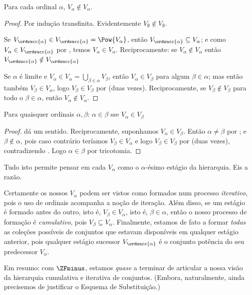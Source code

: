 \documentclass[../../../include/open-logic-section]{subfiles}
\begin{document}
\begin{lem}
Para cada ordinal $\alpha$, $V_\alpha \notin V_\alpha$.
\end{lem}

\begin{proof}
Por indução transfinita. Evidentemente $V_\emptyset \notin V_\emptyset$. 

Se $V_{\ordsucc{\alpha}} \in V_{\ordsucc{\alpha}} = \Pow{V_\alpha}$,
então $V_{\ordsucc{\alpha}} \subseteq V_\alpha$; e como $V_\alpha
\in V_{\ordsucc{\alpha}}$ por , temos
$V_\alpha \in V_\alpha$. Reciprocamente: se $V_\alpha \notin V_\alpha$
então $V_{\ordsucc{\alpha}} \notin V_{\ordsucc{\alpha}}$

Se $\alpha$ é limite e $V_\alpha \in V_\alpha = \bigcup_{\beta \in
\alpha}V_\beta$, então $V_\alpha \in V_\beta$ para algum $\beta \in
\alpha$; mas então também $V_\beta \in V_\alpha$, logo $V_\beta \in
V_\beta$ por  (duas vezes). Reciprocamente, se $V_\beta
\notin V_\beta$ para todo o $\beta \in \alpha$, então $V_\alpha \notin
V_\alpha$.
\end{proof}

\begin{cor}
Para quaisquer ordinais $\alpha, \beta$: $\alpha \in \beta$ sse $V_\alpha \in V_\beta$
\end{cor}

\begin{proof}
 dá um sentido. Reciprocamente, suponhamos $V_\alpha \in V_\beta$. Então $\alpha \neq \beta$ por ; e $\beta \notin \alpha$, pois caso contrário teríamos $V_\beta \in V_\alpha$ e logo $V_\beta \in V_\beta$ por  (duas vezes), contradizendo . Logo $\alpha \in \beta$ por tricotomia.
\end{proof}
\noindent
Tudo isto permite pensar em cada $V_\alpha$ como o $\alpha$-ésimo
estágio da hierarquia. Eis a razão.

Certamente os nossos $V_\alpha$ podem ser vistos como formados num
processo \emph{iterativo}, pois o uso de ordinais acompanha a noção de
iteração. Além disso, se um estágio é formado antes do outro, isto é,
$V_\beta \in V_\alpha$, isto é, $\beta \in \alpha$, então o nosso processo de
formação é \emph{cumulativo}, pois $V_\beta \subseteq V_\alpha$.
Finalmente, estamos de fato a formar \emph{todas} as coleções possíveis de conjuntos
que estavam disponíveis em qualquer estágio anterior, pois qualquer estágio sucessor
$V_{\ordsucc{\alpha}}$ é o conjunto potência do seu predecessor $V_\alpha$.

Em resumo: com $\ZFminus$, estamos \emph{quase} a terminar de articular
a nossa visão da hierarquia cumulativa e iterativa de conjuntos. (Embora,
naturalmente, ainda precisemos de justificar o Esquema de Substituição.)
\end{document}
